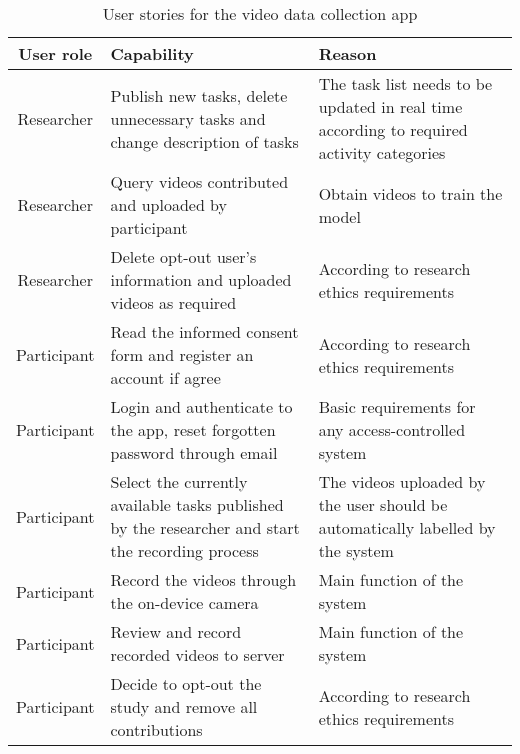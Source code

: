 \begin{table}[!ht]
\renewcommand{\arraystretch}{1.2}
\begin{tabularx}{\textwidth}{|c|X|X|}
\hline
User role   & Capability & Reason \\ \hline
Researcher  & Publish new tasks, delete unnecessary tasks and change description of tasks & The task list needs to be updated in real time according to required activity categories \\ \hline
Researcher  & Query videos contributed and uploaded by participant & Obtain videos to train the model \\ \hline
Researcher  & Delete opt-out user's information and uploaded videos as required & According to research ethics requirements \\ \hline
Participant & Read the informed consent form and register an account if agree & According to research ethics requirements \\ \hline
Participant & Login and authenticate to the app, reset forgotten password through email & Basic requirements for any access-controlled system \\ \hline
Participant & Select the currently available tasks published by the researcher and start the recording process & The videos uploaded by the user should be automatically labelled by the system \\ \hline
Participant & Record the videos through the on-device camera & Main function of the system \\ \hline
Participant & Review and record recorded videos to server & Main function of the system \\ \hline
Participant & Decide to opt-out the study and remove all contributions & According to research ethics requirements \\ \hline
\end{tabularx}
\caption{User stories for the video data collection app}
\label{tab:User stories}
\end{table}
